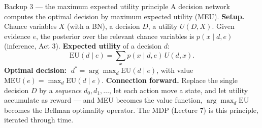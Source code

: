 \documentclass[10pt, aspectratio=169]{beamer}
\begin{document}
\begin{frame}{Backup 3 --- the maximum expected utility principle}
\footnotesize
A decision network computes the optimal decision by \alert{maximum expected utility} (MEU).
\medskip
\textbf{Setup.} Chance variables $X$ (with a BN), a decision $D$, a utility $U(D,X)$. Given evidence $e$, the posterior over the relevant chance variables is $p(x\mid d, e)$ (inference, Act 3).
\medskip
\textbf{Expected utility} of a decision $d$:
\[
\mathrm{EU}(d\mid e) = \sum_x p(x \mid d, e)\, U(d, x).
\]
\textbf{Optimal decision:} $\;d^* = \arg\max_d \mathrm{EU}(d\mid e)$, with value $\mathrm{MEU}(e) = \max_d \mathrm{EU}(d\mid e)$.
\medskip
\textbf{Connection forward.} Replace the single decision $D$ by a \emph{sequence} $d_0, d_1, \dots$, let each action move a state, and let utility accumulate as reward --- and MEU becomes the value function, $\arg\max_d \mathrm{EU}$ becomes the Bellman optimality operator. The MDP (Lecture 7) is this principle, iterated through time.
\end{frame}
\end{document}
